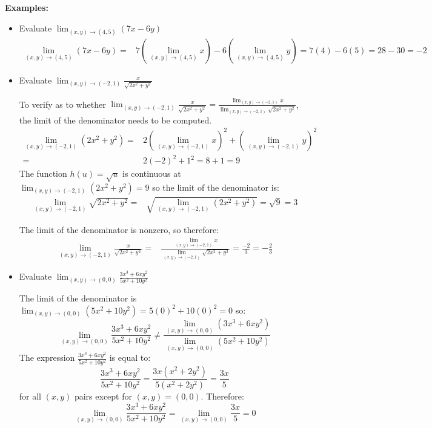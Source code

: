 \documentclass{article}
\begin{document}
\vspace{5mm}

\textbf{Examples:}
\begin{itemize}
\item Evaluate \(\lim_{(x, y) \rightarrow (4, 5)} (7x - 6y)\)
\begin{align*}
\lim_{(x, y) \rightarrow (4, 5)} (7x - 6y) 
= & 7\left(\lim_{(x, y) \rightarrow (4, 5)} x\right) - 6\left(\lim_{(x, y) \rightarrow (4, 5)} y\right) 
= 7(4) - 6(5) 
= 28 - 30 
= -2 
\end{align*}
\item Evaluate \(\lim_{(x, y) \rightarrow (-2, 1)} \frac{x}{\sqrt{2x^2 + y^2}}\)

To verify as to whether \(\lim_{(x, y) \rightarrow (-2, 1)} \frac{x}{\sqrt{2x^2 + y^2}} = \frac{\lim_{(x, y) \rightarrow (-2, 1)} x}{\lim_{(x, y) \rightarrow (-2, 1)} \sqrt{2x^2 + y^2}}\), the limit of the denominator needs to be computed. 
\begin{align*}
\lim_{(x, y) \rightarrow (-2, 1)} (2x^2 + y^2) = & 2\left(\lim_{(x, y) \rightarrow (-2, 1)} x\right)^2 + \left(\lim_{(x, y) \rightarrow (-2, 1)} y\right)^2 \\ 
= & 2(-2)^2 + 1^2 = 8 + 1 = 9
\end{align*}
The function \(h(u) = \sqrt{u}\) is continuous at \(\lim_{(x, y) \rightarrow (-2, 1)} (2x^2 + y^2) = 9\) so the limit of the denominator is:
\begin{align*}
\lim_{(x, y) \rightarrow (-2, 1)} \sqrt{2x^2 + y^2} = & \sqrt{\lim_{(x, y) \rightarrow (-2, 1)} (2x^2 + y^2)} = \sqrt{9} = 3
\end{align*}

The limit of the denominator is nonzero, so therefore:
\begin{align*}
\lim_{(x, y) \rightarrow (-2, 1)} \frac{x}{\sqrt{2x^2 + y^2}} 
= & \frac{\lim_{(x, y) \rightarrow (-2, 1)} x}{\lim_{(x, y) \rightarrow (-2, 1)} \sqrt{2x^2 + y^2}} 
= \frac{-2}{3} = -\frac{2}{3}  
\end{align*}
\item Evaluate \(\lim_{(x, y) \rightarrow (0, 0)} \frac{3x^3 + 6xy^2}{5x^2 + 10y^2}\) 

The limit of the denominator is \(\lim_{(x, y) \rightarrow (0, 0)} (5x^2 + 10y^2) = 5(0)^2 + 10(0)^2 = 0\) so:
\[\lim_{(x, y) \rightarrow (0, 0)} \frac{3x^3 + 6xy^2}{5x^2 + 10y^2} \neq \frac{\lim_{(x, y) \rightarrow (0, 0)} (3x^3 + 6xy^2)}{\lim_{(x, y) \rightarrow (0, 0)} (5x^2 + 10y^2)}\]
The expression \(\frac{3x^3 + 6xy^2}{5x^2 + 10y^2}\) is equal to:
\[\frac{3x^3 + 6xy^2}{5x^2 + 10y^2} = \frac{3x(x^2 + 2y^2)}{5(x^2 + 2y^2)} = \frac{3x}{5}\]
for all \((x, y)\) pairs except for \((x, y) = (0, 0)\). 
Therefore:
\[\lim_{(x, y) \rightarrow (0, 0)} \frac{3x^3 + 6xy^2}{5x^2 + 10y^2} = \lim_{(x, y) \rightarrow (0, 0)} \frac{3x}{5} = 0\]
\end{itemize}
\end{document}
